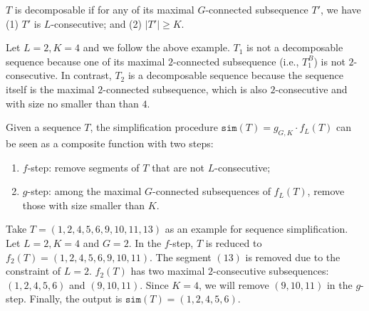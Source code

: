 \begin{definition}
$T$ is decomposable if for any of its maximal $G$-connected subsequence $T'$, we have (1) $T'$ is $L$-consecutive; and (2) $|T'|\geq K$.
\end{definition}

\begin{example}
Let $L = 2, K = 4$ and we follow the above example. $T_1$ is not a decomposable sequence
because one of its maximal $2$-connected subsequence (i.e., $T_1^B$) is not $2$-consecutive.
In contrast, $T_2$ is a decomposable sequence because the sequence itself is the maximal $2$-connected subsequence, which is also $2$-consecutive and with size no smaller than than $4$.
\end{example}



\begin{definition}
Given a sequence $T$, the simplification procedure $\mathtt{sim}(T) =  g_{G,K} \cdot f_L(T) $ can be seen as a composite function with two steps: 
\begin{enumerate}
\item $f$-step: remove segments of $T$ that are not $L$-consecutive;
\item $g$-step: among the maximal $G$-connected subsequences of $f_L(T)$, remove those with size smaller than $K$.
\end{enumerate}
\end{definition}


\begin{example}
Take $T=(1,2,4,5,6,9,10,11,13)$ as an example for sequence simplification. 
Let $L = 2, K = 4$ and $G = 2$. In the $f$-step, $T$ is reduced to $f_2(T)=(1,2,4,5,6,9,10,11)$. 
The segment $(13)$ is removed due to the constraint of $L=2$. 
$f_2(T)$ has two maximal $2$-consecutive subsequences: $(1,2,4,5,6)$ and $(9,10,11)$. 
Since $K=4$, we will remove $(9,10,11)$ in the $g$-step. Finally, the output is $\mathtt{sim}(T)=(1,2,4,5,6)$.
\end{example}

